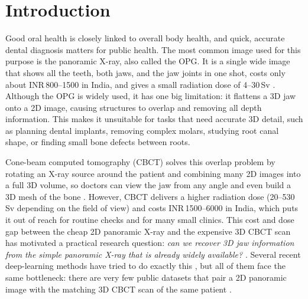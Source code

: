 \documentclass[conference]{IEEEtran}
\begin{document}
\section{Introduction}
\label{sec:intro}

Good oral health is closely linked to overall body health, and quick, accurate dental diagnosis matters for public health. The most common image used for this purpose is the panoramic X-ray, also called the OPG. It is a single wide image that shows all the teeth, both jaws, and the jaw joints in one shot, costs only about INR\,800--1500 in India, and gives a small radiation dose of 4--30\,\textmu Sv \cite{oliveira2025digital}. Although the OPG is widely used, it has one big limitation: it flattens a 3D jaw onto a 2D image, causing structures to overlap and removing all depth information. This makes it unsuitable for tasks that need accurate 3D detail, such as planning dental implants, removing complex molars, studying root canal shape, or finding small bone defects between roots.

Cone-beam computed tomography (CBCT) solves this overlap problem by rotating an X-ray source around the patient and combining many 2D images into a full 3D volume, so doctors can view the jaw from any angle and even build a 3D mesh of the bone \cite{oliveira2025digital}. However, CBCT delivers a higher radiation dose (20--530\,\textmu Sv depending on the field of view) and costs INR\,1500--6000 in India, which puts it out of reach for routine checks and for many small clinics. This cost and dose gap between the cheap 2D panoramic X-ray and the expensive 3D CBCT scan has motivated a practical research question: \textit{can we recover 3D jaw information from the simple panoramic X-ray that is already widely available?} \cite{maken20232d}. Several recent deep-learning methods have tried to do exactly this \cite{song2021oral,song2023oral,park2024nebla,parida2025vit,ma2024px2tooth,mei2023dtr,li20243dpx,anusree2023deep,wang2024neural}, but all of them face the same bottleneck: there are very few public datasets that pair a 2D panoramic image with the matching 3D CBCT scan of the same patient \cite{sunilkumar2024recent}.
\end{document}
